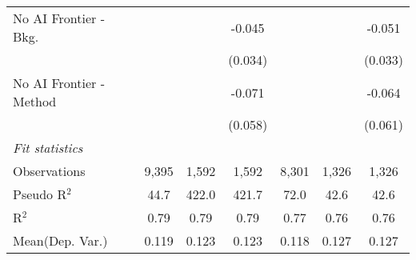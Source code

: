 \begin{tabular}{lcccccc}
   No AI Frontier - Bkg.   &         &         & -0.045  &         &              & -0.051\\   
                           &         &         & (0.034) &         &              & (0.033)\\   
   No AI Frontier - Method &         &         & -0.071  &         &              & -0.064\\   
                           &         &         & (0.058) &         &              & (0.061)\\   
   \midrule
   \emph{Fit statistics}\\
   Observations            & 9,395   & 1,592   & 1,592   & 8,301   & 1,326        & 1,326\\  
   Pseudo R$^2$            & 44.7    & 422.0   & 421.7   & 72.0    & 42.6         & 42.6\\  
   R$^2$                   & 0.79    & 0.79    & 0.79    & 0.77    & 0.76         & 0.76\\  
Mean(Dep. Var.) & 0.119 & 0.123 & 0.123 & 0.118 & 0.127 & 0.127 \\
   

\end{tabular}

